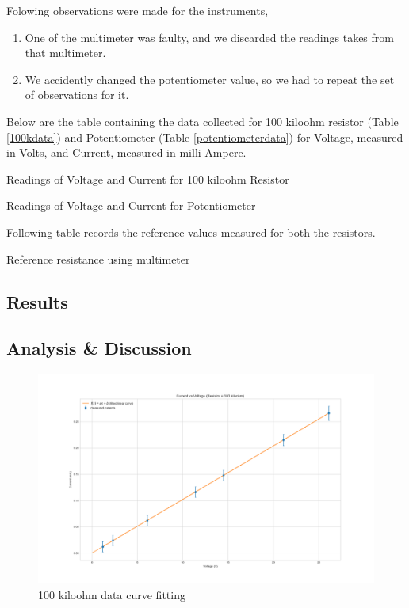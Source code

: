 \documentclass[letterpaper,12pt]{article}
\begin{document}
\noindent
Folowing observations were made for the instruments,

\begin{enumerate}
  \item One of the multimeter was faulty, and we discarded the readings takes from that multimeter.
  \item We accidently changed the potentiometer value, so we had to repeat the set of observations for it.
\end{enumerate}

\noindent
Below are the table containing the data collected for 100 kiloohm resistor (Table \ref{100kdata}) and Potentiometer (Table \ref{potentiometerdata}) for Voltage, measured in Volts, and Current, measured  in milli Ampere.
\begin{table}[H]
  \centering
  \caption{Readings of Voltage and Current for 100 kiloohm Resistor}
  \label{100kdata}
\end{table}

\begin{table}[H]
  \centering
  \caption{Readings of Voltage and Current for Potentiometer}
  \label{potentiometerdata}
\end{table}

\noindent
Following table records the reference values measured for both the resistors.
\begin{table}[H]
  \centering
  \caption{Reference resistance using multimeter}
  \label{referenceres}
\end{table}

\subsection{Results}
\subsection{Analysis \& Discussion }

\begin{figure}[H]
  \centering
  \includegraphics[width=0.8\linewidth]{../lab_1_ex_1_plot_100k.png}    
  \caption{100 kiloohm data curve fitting}
  \label{100k-curve-fit}
\end{figure}
\end{document}
